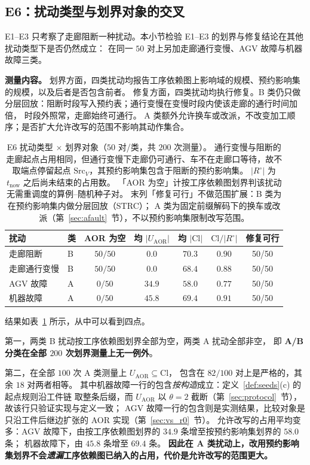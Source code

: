 \documentclass[manuscript,screen,review]{acmart}
\providecommand{\STRC}{\textsc{STRC}}
\newcommand{\NPairs}{50}
\newcommand{\StrictlyLarger}{82/100}
\newcommand{\FeasESixBlock}{\NPairs/\NPairs}
\newcommand{\FeasSlow}{\NPairs/\NPairs}
\newcommand{\FeasESixAgv}{\NPairs/\NPairs}
\newcommand{\FeasESixRa}{\NPairs/\NPairs}
\begin{document}
\subsection{E6：扰动类型与划界对象的交叉}
\label{sec:e6}

E1--E3 只考察了走廊阻断一种扰动。本小节检验 E1--E3 的划界与修复结论在其他扰动类型下是否仍然成立：
在同一 \(\NPairs\) 对上另加走廊通行变慢、AGV 故障与机器故障三类。

\textbf{测量内容。} 划界方面，四类扰动均报告工序依赖图上影响域的规模、预约影响集的规模，以及后者是否包含前者。
修复方面，四类扰动均执行修复。B 类仍只做分层回放：阻断时段写入预约表；通行变慢在变慢时段内使该走廊的通行时间加倍，
时段外照常，走廊始终可通行。
A 类额外允许换车或改派，不改变加工顺序；是否扩大允许改写的范围不影响其动作集合。

\begin{table}[t]
\centering
\caption{E6 扰动类型 \(\times\) 划界对象（\(\NPairs\) 对/类，共 \(200\) 次测量）。
通行变慢与阻断的走廊起点占用相同，但通行变慢下走廊仍可通行、车不在走廊口等待，故不取端点停留起点 \(\mathrm{Src}_V\)，其预约影响集包含于阻断的预约影响集。
\(|R^{\circ}|\) 为 \(t_{\mathrm{now}}\) 之后尚未结束的占用数。
「AOR 为空」计按工序依赖图划界判该扰动无需重调度的算例--随机种子对。
末列「修复可行」不做范围扩展：B 类为在预约影响集内做分层回放（\STRC{}）；
A 类为固定前缀解码下的换车或改派（第~\ref{sec:afault}~节），不以预约影响集限制改写范围。}
\label{tab:e6}
\small
\begin{tabular}{@{}llccccc@{}}
\toprule
扰动 & 类 & AOR 为空 & 均 \(|U_{\mathrm{AOR}}|\) & 均 \(|\mathrm{Cl}|\)
 & \(\mathrm{Cl}/|R^{\circ}|\) & 修复可行 \\
\midrule
走廊阻断   & B & \(50/50\) & \(0.0\)  & \(70.3\) & \(0.90\) & \FeasESixBlock \\
走廊通行变慢 & B & \(50/50\) & \(0.0\)  & \(68.4\) & \(0.88\) & \FeasSlow \\
AGV 故障   & A & \(0/50\)  & \(34.9\) & \(58.0\) & \(0.77\) & \FeasESixAgv \\
机器故障 & A & \(0/50\)  & \(45.8\) & \(69.4\) & \(0.91\) & \FeasESixRa \\
\bottomrule
\end{tabular}
\end{table}

结果如表~\ref{tab:e6} 所示，从中可以看到四点。

第一，两类 B 扰动按工序依赖图划界全部为空，两类 A 扰动全部非空，
即 \textbf{A/B 分类在全部 \(200\) 次划界测量上无一例外}。

第二，在全部 \(100\) 次 A 类测量上 \(U_{\mathrm{AOR}}\subseteq\mathrm{Cl}\)，
包含在 \(\StrictlyLarger\) 对上是严格的，其余 \(18\) 对两者相等。
其中机器故障一行的包含\emph{按构造}成立：定义~\ref{def:seeds}(c) 的起点规则沿工件链
取整条后缀，而 \(U_{\mathrm{AOR}}\) 以 \(\theta=2\) 截断（第~\ref{sec:protocol}~节），故该行只验证实现与定义一致；
AGV 故障一行的包含则是实测结果，比较对象是只沿工件后继边扩张的 AOR 实现（第~\ref{sec:vs_r0}~节）。
允许改写的占用平均变多：AGV 故障下，由按工序依赖图划界的 \(34.9\) 条增至按预约影响集划界的 \(58.0\) 条；
机器故障下，由 \(45.8\) 条增至 \(69.4\) 条。
\textbf{因此在 A 类扰动上，改用预约影响集划界不会\emph{遗漏}工序依赖图已纳入的占用，代价是允许改写的范围更大。}
\end{document}
